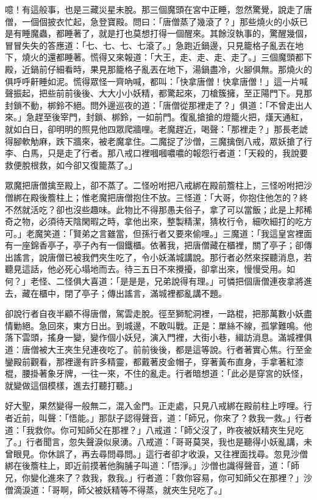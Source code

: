 噫！有這般事，也是三藏災星未脫。那三個魔頭在宮中正睡，忽然驚覺，說走了唐僧，一個個披衣忙起，急登寶殿。問曰：「唐僧蒸了幾滾了？」那些燒火的小妖已是有睡魔蟲，都睡著了，就是打也莫想打得一個醒來。其餘沒執事的，驚醒幾個，冒冒失失的答應道：「七、七、七、七滾了。」急跑近鍋邊，只見籠格子亂丟在地下，燒火的還都睡著。慌得又來報道：「大王，走、走、走、走了。」三個魔頭都下殿，近鍋前仔細看時，果見那籠格子亂丟在地下，湯鍋盡冷，火腳俱無。那燒火的俱呼呼鼾睡如泥。慌得眾怪一齊吶喊，都叫：「快拿唐僧！快拿唐僧！」這一片喊聲振起，把些前前後後、大大小小妖精，都驚起來，刀槍簇擁，至正陽門下。見那封鎖不動，梆鈴不絕。問外邊巡夜的道：「唐僧從那裡走了？」俱道：「不曾走出人來。」急趕至後宰門，封鎖、梆鈴，一如前門。復亂搶搶的燈籠火把，熯天通紅，就如白日，卻明明的照見他四眾爬牆哩。老魔趕近，喝聲：「那裡走？」那長老諕得腳軟觔麻，跌下牆來，被老魔拿住。二魔捉了沙僧，三魔擒倒八戒，眾妖搶了行李、白馬，只是走了行者。那八戒口裡嘓嘓噥噥的報怨行者道：「天殺的，我說要救便脫根救，如今卻又復籠蒸了。」

眾魔把唐僧擒至殿上，卻不蒸了。二怪吩咐把八戒綁在殿前簷柱上，三怪吩咐把沙僧綁在殿後簷柱上；惟老魔把唐僧抱住不放。三怪道：「大哥，你抱住他怎的？終不然就活吃？卻也沒些趣味。此物比不得那愚夫俗子，拿了可以當飯；此是上邦稀奇之物，必須待天陰閑暇之時，拿他出來，整製精潔，猜枚行令，細吹細打的吃方可。」老魔笑道：「賢弟之言雖當，但孫行者又要來偷哩。」三魔道：「我這皇宮裡面有一座錦香亭子，亭子內有一個鐵櫃。依著我，把唐僧藏在櫃裡，關了亭子；卻傳出謠言，說唐僧已被我們夾生吃了，令小妖滿城講說。那行者必然來探聽消息，若聽見這話，他必死心塌地而去。待三五日不來攪擾，卻拿出來，慢慢受用。如何？」老怪、二怪俱大喜道：「是是是，兄弟說得有理。」可憐把個唐僧連夜拿將進去，藏在櫃中，閉了亭子；傳出謠言，滿城裡都亂講不題。

卻說行者自夜半顧不得唐僧，駕雲走脫。徑至獅駝洞裡，一路棍，把那萬數小妖盡情勦絕。急回來，東方日出。到城邊，不敢叫戰。正是：單絲不線，孤掌難鳴。他落下雲頭，搖身一變，變作個小妖兒，演入門裡，大街小巷，緝訪消息。滿城裡俱道：唐僧被大王夾生兒連夜吃了。前前後後，都是這等說。行者著實心焦。行至金鑾殿前觀看，那裡邊有許多精靈，都戴著皮金帽子，穿著黃布直身，手拿著紅漆棍，腰掛著象牙牌，一往一來，不住的亂走。行者暗想道：「此必是穿宮的妖怪，就變做這個模樣，進去打聽打聽。」

好大聖，果然變得一般無二，混入金門。正走處，只見八戒綁在殿前柱上哼哩。行者近前，叫聲：「悟能。」那獃子認得聲音，道：「師兄，你來了？救我一救。」行者道：「我救你。你可知師父在那裡？」八戒道：「師父沒了，昨夜被妖精夾生兒吃了。」行者聞言，忽失聲淚似泉湧。八戒道：「哥哥莫哭，我也是聽得小妖亂講，未曾眼見。你休誤了，再去尋問尋問。」這行者卻才收淚，又往裡面找尋。忽見沙僧綁在後簷柱上，即近前摸著他胸脯子叫道：「悟淨。」沙僧也識得聲音，道：「師兄，你變化進來了？救我，救我。」行者道：「救你容易，你可知師父在那裡？」沙僧滴淚道：「哥啊，師父被妖精等不得蒸，就夾生兒吃了。」

